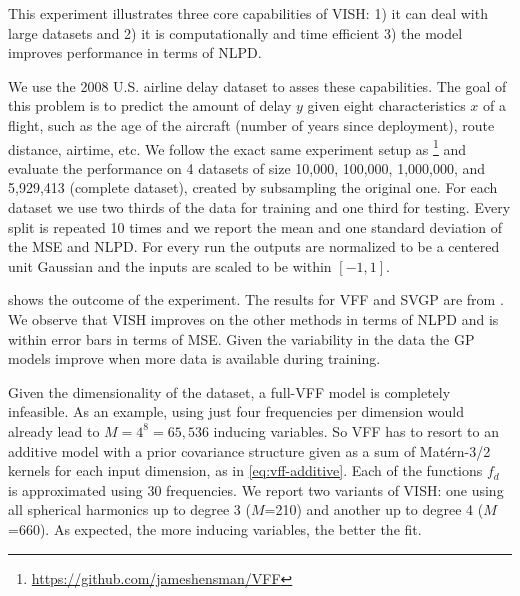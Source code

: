 This experiment illustrates three core capabilities of VISH: 1) it can deal with large datasets and 2) it is computationally and time efficient 3) the model improves performance in terms of NLPD.

We use the 2008 U.S. airline delay dataset to asses these capabilities. The goal of this problem is to predict the amount of delay $y$ given eight characteristics $x$ of a flight, such as the age of the aircraft (number of years since deployment), route distance, airtime, etc. We follow the exact same experiment setup as \citet{hensman2017variational}\footnote{\url{https://github.com/jameshensman/VFF}} and evaluate the performance on 4 datasets of size 10,000, 100,000, 1,000,000, and 5,929,413 (complete dataset), created by subsampling the original one. For each dataset we use two thirds of the data for training and one third for testing. Every split is repeated 10 times and we report the mean and one standard deviation of the MSE and NLPD. For every run the outputs are normalized to be a centered unit Gaussian and the inputs are scaled to be within $[-1, 1]$.

 shows the outcome of the experiment. The results for VFF and SVGP are from \citet{hensman2017variational}. We observe that VISH improves on the other methods in terms of NLPD and is within error bars in terms of MSE. Given the variability in the data the GP models improve when more data is available during training.

Given the dimensionality of the dataset, a full-VFF model is completely infeasible. As an example, using just four frequencies per dimension would already lead to $M = 4^8 = 65,536$ inducing variables. So VFF has to resort to an additive model with a prior covariance structure given as a sum of Mat\'ern-3/2 kernels for each input dimension, as in \cref{eq:vff-additive}. Each of the functions $f_d$ is approximated using 30 frequencies.
We report two variants of VISH: one using all spherical harmonics up to degree 3 ($M$=210) and another up to degree 4 ($M$=660). As expected, the more inducing variables, the better the fit.

